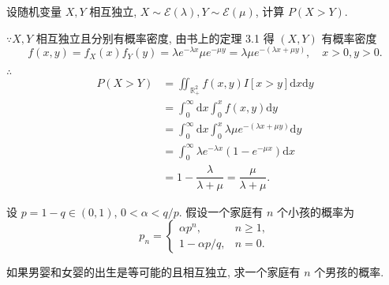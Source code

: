 \documentclass[color=black,device=normal,lang=cn]{elegantnote}
\numberwithin{equation}{section}
\theoremstyle{plain}
\numberwithin{exercise}{exsection}
\begin{document}
\addtocounter{exercise}{2}
\begin{exercise}%
    设随机变量 $X,Y$ 相互独立, $X\sim\mathcal{E}(\lambda),Y\sim\mathcal{E}(\mu)$, 计算 $P(X>Y)$.
\end{exercise}
\begin{solution}
    $\because X,Y$ 相互独立且分别有概率密度, 由书上的定理 3.1 得 $(X,Y)$ 有概率密度
    \[f(x,y)=f_X(x)f_Y(y)=\lambda e^{-\lambda x}\mu e^{-\mu y}=\lambda\mu e^{-(\lambda x+\mu y)},\quad x>0,y>0.\]

    $\therefore$
    \begin{align*}
        P(X>Y) & =\iint_{\mathbb{R}_+^2}f(x,y)I[x>y]\mathrm{d}x\mathrm{d}y \\
        & =\int_0^\infty\mathrm{d}x\int_0^xf(x,y)\mathrm{d}y \\
        & =\int_0^\infty\mathrm{d}x\int_0^x\lambda\mu e^{-(\lambda x+\mu y)}\mathrm{d}y \\
        & =\int_0^\infty\lambda e^{-\lambda x}(1-e^{-\mu x})\mathrm{d}x \\
        & =1-\dfrac{\lambda}{\lambda+\mu}=\dfrac{\mu}{\lambda+\mu}.
    \end{align*}
\end{solution}
\begin{exercise}%
    设 $p=1-q\in(0,1)$, $0<\alpha<q/p$. 假设一个家庭有 $n$ 个小孩的概率为
    \[p_n=\begin{cases}
        \alpha p^n, & n\geq 1, \\
        1-\alpha p/q, & n=0.
    \end{cases}\]

    如果男婴和女婴的出生是等可能的且相互独立, 求一个家庭有 $n$ 个男孩的概率.
\end{exercise}
\end{document}
